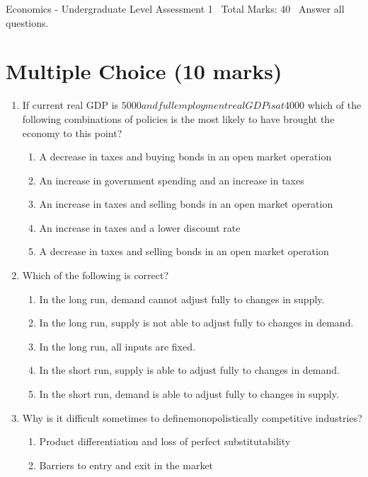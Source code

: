 \documentclass[12pt]{article}
\begin{document}
\begin{center}
Economics - Undergraduate Level Assessment 1 \
Total Marks: 40 \
Answer all questions.
\end{center}

\section*{Multiple Choice (10 marks)}
\begin{enumerate}[label=\arabic*.]
\item If current real GDP is $5000 and full employment real GDP is at $4000 which of the
following combinations of policies is the most likely to have brought the economy to this
point?
\begin{enumerate}[label=(\alph*)]
    \item A decrease in taxes and buying bonds in an open market operation
    \item An increase in government spending and an increase in taxes
    \item An increase in taxes and selling bonds in an open market operation
    \item An increase in taxes and a lower discount rate
    \item A decrease in taxes and selling bonds in an open market operation
\end{enumerate}
\item Which of the following is correct?
\begin{enumerate}[label=(\alph*)]
    \item In the long run, demand cannot adjust fully to changes in supply.
    \item In the long run, supply is not able to adjust fully to changes in demand.
    \item In the long run, all inputs are fixed.
    \item In the short run, supply is able to adjust fully to changes in demand.
    \item In the short run, demand is able to adjust fully to changes in supply.
\end{enumerate}
\item Why is it difficult sometimes to definemonopolistically competitive industries?
\begin{enumerate}[label=(\alph*)]
    \item Product differentiation and loss of perfect substitutability
    \item Barriers to entry and exit in the market

\end{enumerate}
\end{enumerate}
\end{document}

